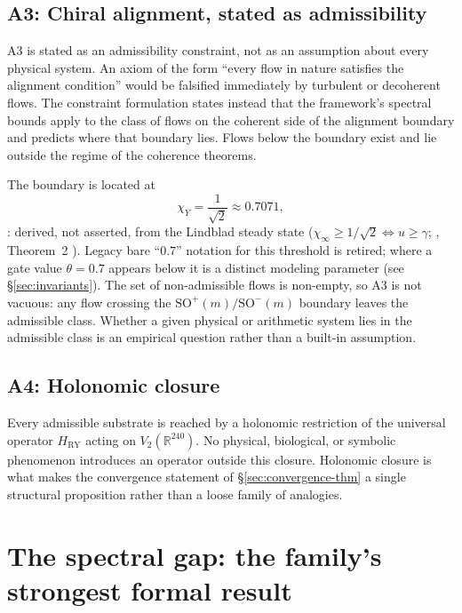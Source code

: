 \documentclass{alienfolio}
\begin{document}
\subsection{A3: Chiral alignment, stated as admissibility}

A3 is stated as an admissibility constraint, not as an assumption about
every physical system. An axiom of the form ``every flow in nature
satisfies the alignment condition'' would be falsified immediately by
turbulent or decoherent flows. The constraint formulation states instead
that the framework's spectral bounds apply to the class of flows on the
coherent side of the alignment boundary and predicts where that
boundary lies. Flows below the boundary exist and lie outside the
regime of the coherence theorems.

The boundary is located at
\begin{equation}
\chi_{Y} = \frac{1}{\sqrt{2}} \approx 0.7071,
\label{eq:chiY}
\end{equation}
: derived, not asserted, from the Lindblad steady
state ($\chi_{\infty} \ge 1/\sqrt{2} \iff u \ge \gamma$;
, Theorem~2 \cite{sovcog}). Legacy bare
``$0.7$'' notation for this threshold is retired; where a gate value
$\theta = 0.7$ appears below it is a distinct modeling parameter (see
\S\ref{sec:invariants}). The set of non-admissible flows is non-empty,
so A3 is not vacuous: any flow crossing the
$\mathrm{SO}^{+}(m)/\mathrm{SO}^{-}(m)$ boundary leaves the admissible
class. Whether a given physical or arithmetic system lies in the
admissible class is an empirical question rather than a built-in
assumption.

\subsection{A4: Holonomic closure}

Every admissible substrate is reached by a holonomic restriction of
the universal operator $H_{\mathrm{RY}}$ acting on
$V_{2}(\mathbb{R}^{240})$. No physical, biological, or symbolic
phenomenon introduces an operator outside this closure. Holonomic
closure is what makes the convergence statement of
\S\ref{sec:convergence-thm} a single structural proposition rather than a
loose family of analogies.

\goldrule

\section{The spectral gap: the family's strongest formal result}
\label{sec:gap}
\end{document}
